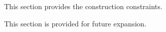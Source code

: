 This section provides the construction constraints.

This section is provided for future expansion.



%




%